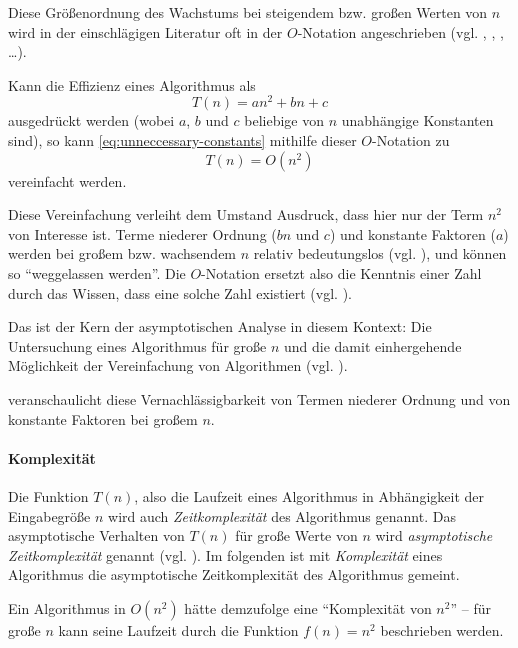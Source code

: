 Diese Größenordnung des Wachstums bei steigendem bzw. großen Werten von $n$ wird in der einschlägigen Literatur oft in der $O$-Notation angeschrieben (vgl. \cite[2]{ahu1974}, \cite[107]{taocp1}, \cite[29]{hsr1997}, \ldots).

Kann die Effizienz eines Algorithmus als
\begin{equation}\label{eq:unneccessary-constants}
    T(n) = an^2 + bn + c
\end{equation}
ausgedrückt werden (wobei $a$, $b$ und $c$ beliebige von $n$ unabhängige Konstanten sind), so kann \eqref{eq:unneccessary-constants} mithilfe dieser $O$-Notation zu
\begin{equation}\label{eq:basic-o-notation}
    T(n) = O(n^2)
\end{equation}
vereinfacht werden.

Diese Vereinfachung verleiht dem Umstand Ausdruck, dass hier nur der Term $n^2$ von Interesse ist. Terme niederer Ordnung ($bn$ und $c$) und konstante Faktoren ($a$) werden bei großem bzw. wachsendem $n$ relativ bedeutungslos (vgl. \cite[28]{clrs2001}), und können so \enquote{weggelassen werden}. Die $O$-Notation ersetzt also die Kenntnis einer Zahl durch das Wissen, dass eine solche Zahl existiert (vgl. \cite[3]{bru1958}).

Das ist der Kern der asymptotischen Analyse in diesem Kontext: Die Untersuchung eines Algorithmus für große $n$ und die damit einhergehende Möglichkeit der Vereinfachung von Algorithmen (vgl. \cite[63]{sha2011}).



 veranschaulicht diese Vernachlässigbarkeit von Termen niederer Ordnung und von konstante Faktoren bei großem $n$.

\paragraph{Komplexität} Die Funktion $T(n)$, also die Laufzeit eines Algorithmus in Abhängigkeit der Eingabegröße $n$ wird auch \emph{Zeitkomplexität} des Algorithmus genannt. Das asymptotische Verhalten von $T(n)$ für große Werte von $n$ wird \emph{asymptotische Zeitkomplexität} genannt (vgl. \cite[2]{ahu1974}). Im folgenden ist mit \emph{Komplexität} eines Algorithmus die asymptotische Zeitkomplexität des Algorithmus gemeint.

Ein Algorithmus in $O(n^2)$ hätte demzufolge eine \enquote{Komplexität von $n^2$} -- für große $n$ kann seine Laufzeit durch die Funktion $f(n) = n^2$ beschrieben werden.

